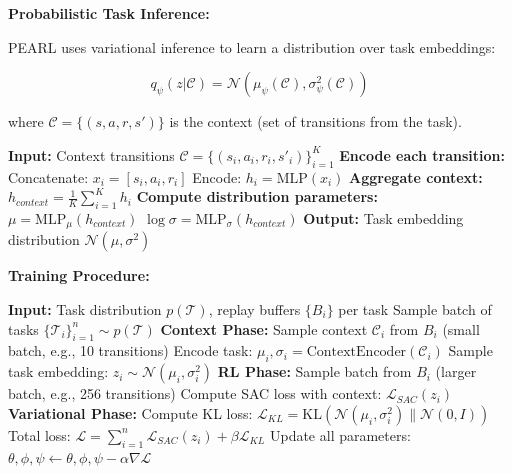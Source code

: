 \documentclass[12pt]{article}
\newcommand{\ieee}[1]{\textcolor{IEEEBlue}{\textbf{#1}}}
\begin{document}
{{			\ieee{Probabilistic Task Inference:}
			
			PEARL uses variational inference to learn a distribution over task embeddings:
			
			\begin{equation}
			q_\psi(z|\mathcal{C}) = \mathcal{N}(\mu_\psi(\mathcal{C}), \sigma_\psi^2(\mathcal{C}))
			\end{equation}
			
			where $\mathcal{C} = \{(s, a, r, s')\}$ is the context (set of transitions from the task).
			
			\begin{algorithm}[H]
			\caption{PEARL Context Encoder}
			\begin{algorithmic}[1]
			\STATE \textbf{Input:} Context transitions $\mathcal{C} = \{(s_i, a_i, r_i, s'_i)\}_{i=1}^K$
			\STATE \textbf{Encode each transition:}
			\STATE Concatenate: $x_i = [s_i, a_i, r_i]$
			\STATE Encode: $h_i = \text{MLP}(x_i)$
			\ENDFOR
			\STATE \textbf{Aggregate context:}
			\STATE $h_{context} = \frac{1}{K} \sum_{i=1}^K h_i$ 
			\STATE \textbf{Compute distribution parameters:}
			\STATE $\mu = \text{MLP}_\mu(h_{context})$
			\STATE $\log\sigma = \text{MLP}_\sigma(h_{context})$
			\STATE \textbf{Output:} Task embedding distribution $\mathcal{N}(\mu, \sigma^2)$
			\end{algorithmic}
			\end{algorithm}
			
			\ieee{Training Procedure:}
			
			\begin{algorithm}[H]
			\caption{PEARL Meta-Training}
			\begin{algorithmic}[1]
			\STATE \textbf{Input:} Task distribution $p(\mathcal{T})$, replay buffers $\{B_i\}$ per task
			\STATE Sample batch of tasks $\{\mathcal{T}_i\}_{i=1}^n \sim p(\mathcal{T})$
			\STATE \textbf{Context Phase:}
			\STATE Sample context $\mathcal{C}_i$ from $B_i$ (small batch, e.g., 10 transitions)
			\STATE Encode task: $\mu_i, \sigma_i = \text{ContextEncoder}(\mathcal{C}_i)$
			\STATE Sample task embedding: $z_i \sim \mathcal{N}(\mu_i, \sigma_i^2)$
			\STATE \textbf{RL Phase:}
			\STATE Sample batch from $B_i$ (larger batch, e.g., 256 transitions)
			\STATE Compute SAC loss with context: $\mathcal{L}_{SAC}(z_i)$
			\STATE \textbf{Variational Phase:}
			\STATE Compute KL loss: $\mathcal{L}_{KL} = \text{KL}(\mathcal{N}(\mu_i, \sigma_i^2) \| \mathcal{N}(0, I))$
			\ENDFOR
			\STATE Total loss: $\mathcal{L} = \sum_{i=1}^n \mathcal{L}_{SAC}(z_i) + \beta \mathcal{L}_{KL}$
			\STATE Update all parameters: $\theta, \phi, \psi \leftarrow \theta, \phi, \psi - \alpha \nabla \mathcal{L}$
			\ENDWHILE
			\end{algorithmic}
			\end{algorithm}
			
}}
\end{document}
